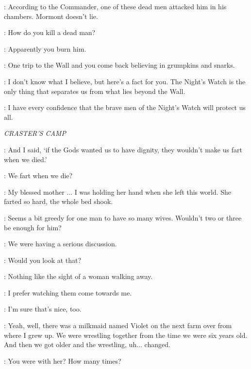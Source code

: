 
\TYRION: According to the Commander, one of these dead men attacked him in his chambers. Mormont doesn't lie.


\VARYS: How do you kill a dead man?

\TYRION: Apparently you burn him.

\CERSEI: One trip to the Wall and you come back believing in grumpkins and snarks.

\TYRION: I don't know what I believe, but here's a fact for you. The Night's Watch is the only thing that separates us from what lies beyond the Wall.

\CERSEI: I have every confidence that the brave men of the Night's Watch will protect us all.



\scene

\textit{CRASTER'S CAMP}

\EDD: And I said, `if the Gods wanted us to have dignity, they wouldn't make us fart when we died.'

\GRENN: We fart when we die?

\EDD: My blessed mother $\ldots$ I was holding her hand when she left this world. She farted so hard, the whole bed shook.


\SAM: Seems a bit greedy for one man to have so many wives. Wouldn't two or three be enough for him?

\EDD: We were having a serious discussion.


\GRENN: Would you look at that?

\SAM: Nothing like the sight of a woman walking away.

\GRENN: I prefer watching them come towards me.

\SAM: I'm sure that's nice, too.

\GRENN: Yeah, well, there was a milkmaid named Violet on the next farm over from where I grew up. We were wrestling together from the time we were six years old. And then we got older and the wrestling, uh$\ldots$ changed.

\SAM: You were with her? How many times?

